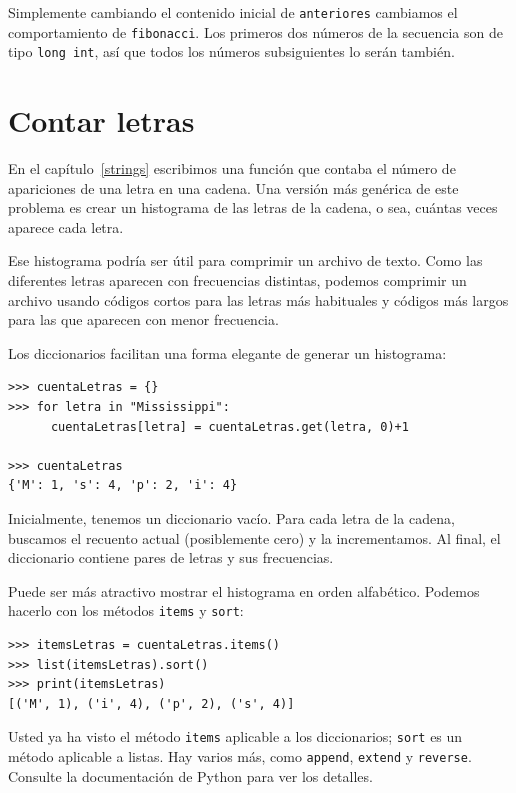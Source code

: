 Simplemente cambiando el contenido inicial de \texttt{anteriores}
cambiamos el comportamiento de \texttt{fibonacci}. Los primeros dos
números de la secuencia son de tipo \texttt{long int}, así que todos
los números subsiguientes lo serán también.

 

\section{Contar letras}

  

En el capítulo~\ref{strings} escribimos una función que contaba
el número de apariciones de una letra en una cadena. Una versión más
genérica de este problema es crear un histograma de las letras de
la cadena, o sea, cuántas veces aparece cada letra.

Ese histograma podría ser útil para comprimir un archivo de texto.
Como las diferentes letras aparecen con frecuencias distintas, podemos
comprimir un archivo usando códigos cortos para las letras más habituales
y códigos más largos para las que aparecen con menor frecuencia.

Los diccionarios facilitan una forma elegante de generar un histograma:
\begin{verbatim}
>>> cuentaLetras = {}
>>> for letra in "Mississippi":
      cuentaLetras[letra] = cuentaLetras.get(letra, 0)+1

>>> cuentaLetras
{'M': 1, 's': 4, 'p': 2, 'i': 4}
\end{verbatim}

Inicialmente, tenemos un diccionario vacío. Para cada letra de la
cadena, buscamos el recuento actual (posiblemente cero) y la incrementamos.
Al final, el diccionario contiene pares de letras y sus frecuencias.

Puede ser más atractivo mostrar el histograma en orden alfabético.
Podemos hacerlo con los métodos \texttt{items} y \texttt{sort}:
\begin{verbatim}
>>> itemsLetras = cuentaLetras.items()
>>> list(itemsLetras).sort()
>>> print(itemsLetras)
[('M', 1), ('i', 4), ('p', 2), ('s', 4)]
\end{verbatim}

Usted ya ha visto el método \texttt{items} aplicable a los diccionarios;
\texttt{sort} es un método aplicable a listas. Hay varios más, como
\texttt{append}, \texttt{extend} y \texttt{reverse}. Consulte la documentación
de Python para ver los detalles.

